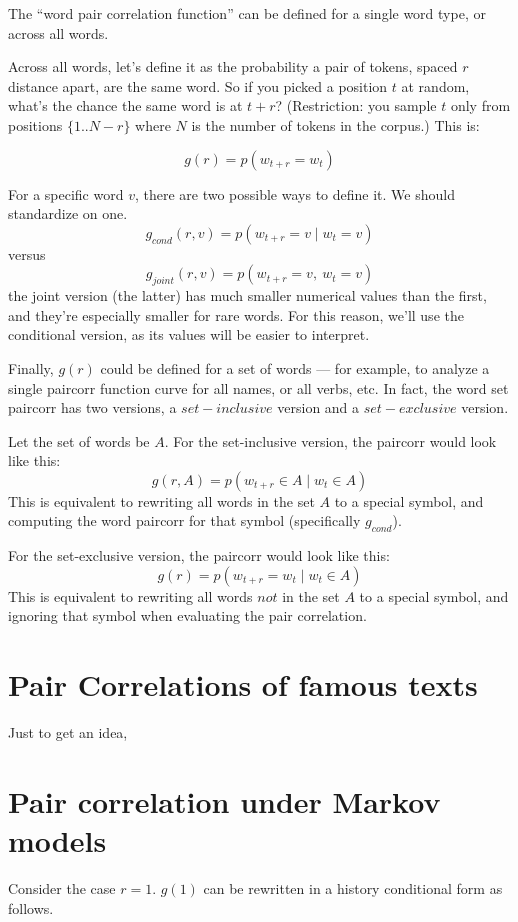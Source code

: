 \documentclass[11pt,letterpaper]{article}
\theoremstyle{definition}
\begin{document}
The ``word pair correlation function'' can be defined for a single word type, or across all words.

Across all words, let's define it as the probability a pair of tokens, spaced $r$ distance apart, are the same word.  So if you picked a position $t$ at random, what's the chance the same word is at $t+r$?  (Restriction: you sample $t$ only from positions $\{1..N-r\}$ where $N$ is the number of tokens in the corpus.)  This is:

\[ g(r) = p(w_{t+r} = w_{t}) \]

For a specific word $v$, there are two possible ways to define it.  We should standardize on one.
\[ g_{cond}(r,v) = p(w_{t+r} = v \mid  w_t = v) \]
versus
\[ g_{joint}(r,v) = p(w_{t+r} = v,\ w_t = v) \]
the joint version (the latter) has much smaller numerical values than the first, and they're especially smaller for rare words. For this reason, we'll use the conditional version, as its values will be easier to interpret.

Finally, $g(r)$ could be defined for a set of words --- for example, to analyze a single paircorr function curve for all names, or all verbs, etc. In fact, the word set paircorr has two versions, a $set-inclusive$ version and a $set-exclusive$ version.

Let the set of words be $A$. 
For the set-inclusive version, the paircorr would look like this:
\[ g(r,A) = p(w_{t+r} \in A \mid w_t \in A) \]
This is equivalent to rewriting all words in the set $A$ to a special symbol, and computing the word paircorr for that symbol (specifically $g_{cond}$).

For the set-exclusive version, the paircorr would look like this:
\[ g(r) = p(w_{t+r} = w_{t} \mid w_t \in A)  \]
This is equivalent to rewriting all words $not$ in the set $A$ to a special symbol, and ignoring that symbol when evaluating the pair correlation.


\section{Pair Correlations of famous texts}

Just to get an idea, 

\section{Pair correlation under Markov models}

Consider the case $r=1$.  $g(1)$ can be rewritten in a history conditional form as follows.
\end{document}
